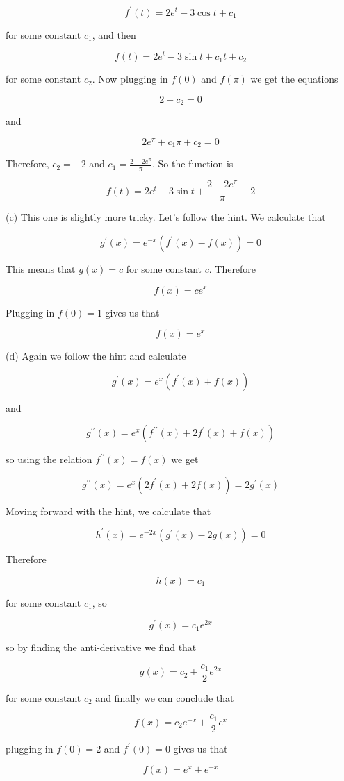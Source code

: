 \documentclass[10pt]{article}
\begin{document}
$$
f^{\prime}(t)=2 e^{t}-3 \cos t+c_{1}
$$

for some constant $c_{1}$, and then

$$
f(t)=2 e^{t}-3 \sin t+c_{1} t+c_{2}
$$

for some constant $c_{2}$. Now plugging in $f(0)$ and $f(\pi)$ we get the equations

$$
2+c_{2}=0
$$

and

$$
2 e^{\pi}+c_{1} \pi+c_{2}=0
$$

Therefore, $c_{2}=-2$ and $c_{1}=\frac{2-2 e^{\pi}}{\pi}$. So the function is

$$
f(t)=2 e^{t}-3 \sin t+\frac{2-2 e^{\pi}}{\pi}-2
$$

(c) This one is slightly more tricky. Let's follow the hint. We calculate that

$$
g^{\prime}(x)=e^{-x}\left(f^{\prime}(x)-f(x)\right)=0
$$

This means that $g(x)=c$ for some constant $c$. Therefore

$$
f(x)=c e^{x}
$$

Plugging in $f(0)=1$ gives us that

$$
f(x)=e^{x}
$$

(d) Again we follow the hint and calculate

$$
g^{\prime}(x)=e^{x}\left(f^{\prime}(x)+f(x)\right)
$$

and

$$
g^{\prime \prime}(x)=e^{x}\left(f^{\prime \prime}(x)+2 f^{\prime}(x)+f(x)\right)
$$

so using the relation $f^{\prime \prime}(x)=f(x)$ we get

$$
g^{\prime \prime}(x)=e^{x}\left(2 f^{\prime}(x)+2 f(x)\right)=2 g^{\prime}(x)
$$

Moving forward with the hint, we calculate that

$$
h^{\prime}(x)=e^{-2 x}\left(g^{\prime}(x)-2 g(x)\right)=0
$$

Therefore

$$
h(x)=c_{1}
$$

for some constant $c_{1}$, so

$$
g^{\prime}(x)=c_{1} e^{2 x}
$$

so by finding the anti-derivative we find that

$$
g(x)=c_{2}+\frac{c_{1}}{2} e^{2 x}
$$

for some constant $c_{2}$ and finally we can conclude that

$$
f(x)=c_{2} e^{-x}+\frac{c_{1}}{2} e^{x}
$$

plugging in $f(0)=2$ and $f^{\prime}(0)=0$ gives us that

$$
f(x)=e^{x}+e^{-x}
$$
\end{document}
